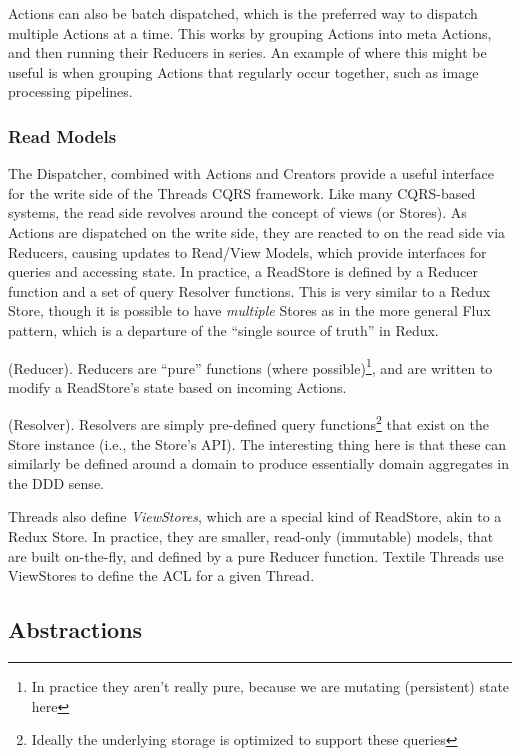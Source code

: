 \documentclass{textile}
\begin{document}
Actions can also be batch dispatched, which is the preferred way to dispatch multiple Actions at a time. This works by grouping Actions into meta Actions, and then running their Reducers in series. An example of where this might be useful is when grouping Actions that regularly occur together, such as image processing pipelines.

\subsubsection{Read Models}\label{sec:readModels}

The Dispatcher, combined with Actions and Creators provide a useful interface for the write side of the Threads CQRS framework. Like many CQRS-based systems, the read side revolves around the concept of views (or Stores). As Actions are dispatched on the write side, they are reacted to on the read side via Reducers, causing updates to Read/View Models, which provide interfaces for queries and accessing state. In practice, a ReadStore is defined by a Reducer function and a set of query Resolver functions. This is very similar to a Redux Store, though it is possible to have \emph{multiple} Stores as in the more general Flux pattern, which is a departure of the ``single source of truth'' in Redux.

\begin{definition}
  (Reducer). Reducers are ``pure'' functions (where possible)\footnote{In practice they aren't really pure, because we are mutating (persistent) state here}, and are written to modify a ReadStore's state based on incoming Actions.  
\end{definition}

\begin{definition}
  (Resolver). Resolvers are simply pre-defined query functions\footnote{Ideally the underlying storage is optimized to support these queries} that exist on the Store instance (i.e., the Store's API). The interesting thing here is that these can similarly be defined around a domain to produce essentially domain aggregates in the DDD sense.
\end{definition}

Threads also define \emph{ViewStores}, which are a special kind of ReadStore, akin to a Redux Store. In practice, they are smaller, read-only (immutable) models, that are built on-the-fly, and defined by a pure Reducer function. Textile Threads use ViewStores to define the ACL for a given Thread.

\subsection{Abstractions}\label{sec:DefaultViews}
\end{document}
